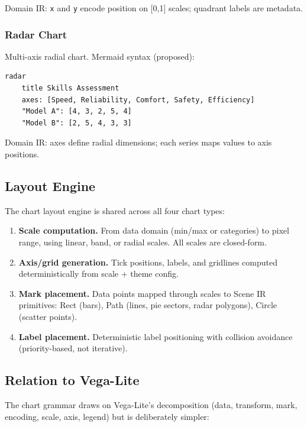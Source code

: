 \noindent Domain IR: \texttt{x} and \texttt{y} encode position on [0,1] scales;
quadrant labels are metadata.

\subsubsection{Radar Chart}

Multi-axis radial chart. Mermaid syntax (proposed):

\begin{Verbatim}[fontsize=\small]
radar
    title Skills Assessment
    axes: [Speed, Reliability, Comfort, Safety, Efficiency]
    "Model A": [4, 3, 2, 5, 4]
    "Model B": [2, 5, 4, 3, 3]
\end{Verbatim}

\noindent Domain IR: axes define radial dimensions; each series maps values to axis positions.

\subsection{Layout Engine}

The chart layout engine is shared across all four chart types:

\begin{enumerate}
  \item \textbf{Scale computation.} From data domain (min/max or categories) to pixel range,
        using linear, band, or radial scales. All scales are closed-form.
  \item \textbf{Axis/grid generation.} Tick positions, labels, and gridlines computed
        deterministically from scale + theme config.
  \item \textbf{Mark placement.} Data points mapped through scales to Scene IR primitives:
        Rect (bars), Path (lines, pie sectors, radar polygons), Circle (scatter points).
  \item \textbf{Label placement.} Deterministic label positioning with collision avoidance
        (priority-based, not iterative).
\end{enumerate}

\subsection{Relation to Vega-Lite}

The chart grammar draws on Vega-Lite's decomposition (data, transform, mark, encoding,
scale, axis, legend) but is deliberately simpler:

